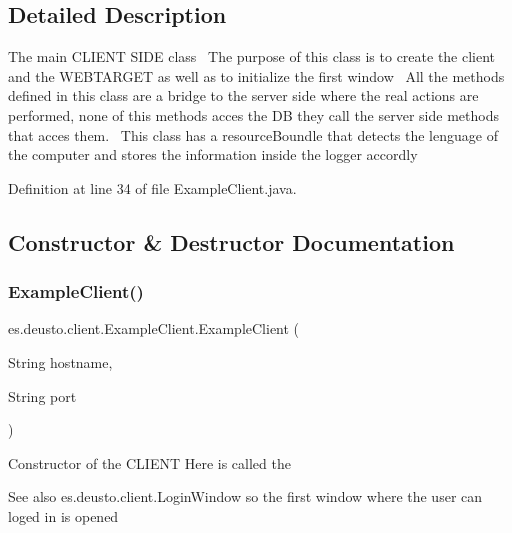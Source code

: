 \subsection{Detailed Description}
The main C\+L\+I\+E\+NT S\+I\+DE class~\newline
The purpose of this class is to create the client and the W\+E\+B\+T\+A\+R\+G\+ET as well as to initialize the first window~\newline
All the methods defined in this class are a bridge to the server side where the real actions are performed, none of this methods acces the DB they call the server side methods that acces them.~\newline
This class has a resource\+Boundle that detects the lenguage of the computer and stores the information inside the logger accordly 

Definition at line 34 of file Example\+Client.\+java.



\subsection{Constructor \& Destructor Documentation}
\mbox{\label{classes_1_1deusto_1_1client_1_1_example_client_afe4bf9d0ff661de1e0ba936df0ce807f}} 
\subsubsection{\texorpdfstring{Example\+Client()}{ExampleClient()}}
{\footnotesize\ttfamily es.\+deusto.\+client.\+Example\+Client.\+Example\+Client (\begin{DoxyParamCaption}\item[{String}]{hostname,  }\item[{String}]{port }\end{DoxyParamCaption})}

Constructor of the C\+L\+I\+E\+NT Here is called the \begin{DoxySeeAlso}{See also}
es.\+deusto.\+client.\+Login\+Window so the first window where the user can loged in is opened 
\end{DoxySeeAlso}

